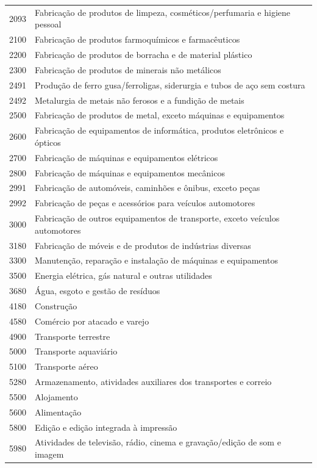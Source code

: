 \begin{longtable}{@{}lp{}@{}}
2093 & Fabricação de produtos de limpeza, cosméticos/perfumaria e higiene pessoal \\
2100 & Fabricação de produtos farmoquímicos e farmacêuticos \\
2200 & Fabricação de produtos de borracha e de material plástico \\
2300 & Fabricação de produtos de minerais não metálicos \\
2491 & Produção de ferro gusa/ferroligas, siderurgia e tubos de aço sem costura \\
2492 & Metalurgia de metais não ferosos e a fundição de metais \\
2500 & Fabricação de produtos de metal, exceto máquinas e equipamentos \\
2600 & Fabricação de equipamentos de informática, produtos eletrônicos e ópticos \\
2700 & Fabricação de máquinas e equipamentos elétricos \\
2800 & Fabricação de máquinas e equipamentos mecânicos \\
2991 & Fabricação de automóveis, caminhões e ônibus, exceto peças \\
2992 & Fabricação de peças e acessórios para veículos automotores \\
3000 & Fabricação de outros equipamentos de transporte, exceto veículos automotores \\
3180 & Fabricação de móveis e de produtos de indústrias diversas \\
3300 & Manutenção, reparação e instalação de máquinas e equipamentos \\
3500 & Energia elétrica, gás natural e outras utilidades \\
3680 & Água, esgoto e gestão de resíduos \\
4180 & Construção \\
4580 & Comércio por atacado e varejo \\
4900 & Transporte terrestre \\
5000 & Transporte aquaviário \\
5100 & Transporte aéreo \\
5280 & Armazenamento, atividades auxiliares dos transportes e correio \\
5500 & Alojamento \\
5600 & Alimentação \\
5800 & Edição e edição integrada à impressão \\
5980 & Atividades de televisão, rádio, cinema e  gravação/edição de som e imagem \\

\end{longtable}
